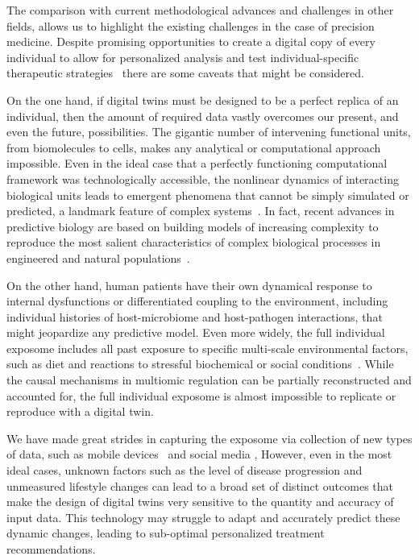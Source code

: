 \documentclass[12pt]{article}
\renewcommand{\(}{\left(}
\renewcommand{\)}{\right)}
\renewcommand{\[}{\left[}
\renewcommand{\]}{\right]}
\begin{document}
The comparison with current methodological advances and challenges in other fields, allows us to highlight the existing challenges in the case of precision medicine. Despite promising opportunities to create a digital copy of every individual to allow for personalized analysis and test individual-specific therapeutic strategies~\cite{laubenbacher2024digital,kamel2021digital,bjornsson2020digital} there are some caveats that might be considered. 

On the one hand, if digital twins must be designed to be a perfect replica of an individual, then the amount of required data vastly overcomes our present, and even the future, possibilities. The gigantic number of intervening functional units, from biomolecules to cells, makes any analytical or computational approach impossible. Even in the ideal case that a perfectly functioning computational  framework was technologically accessible, the nonlinear dynamics of interacting biological units leads to emergent phenomena that cannot be simply simulated or predicted, a landmark feature of complex systems~\cite{artime2022origin,rosen1987complex}. In fact, recent advances in predictive biology are based on building models of increasing complexity to reproduce the most salient characteristics of complex biological processes in engineered and natural populations~\cite{lopatkin2020predictive}. 

On the other hand, human patients have their own dynamical response to internal dysfunctions or differentiated coupling to the environment, including individual histories of host-microbiome and host-pathogen interactions, that might jeopardize any predictive model. 
Even more widely, the full individual exposome includes all past exposure to specific multi-scale environmental factors, such as diet and reactions to stressful biochemical or social conditions~\cite{vermeulen2020exposome,vineis2020new}. While the causal mechanisms in multiomic regulation can be partially reconstructed and accounted for, the full individual exposome is almost impossible to replicate or reproduce with a digital twin.

We have made great strides in capturing the exposome via collection of new types of data, such as mobile devices~\cite{steinhubl2015emerging} and social media \cite{correia2020mining}, 
%
However, even in the most ideal cases, unknown factors such as the level of disease progression and unmeasured lifestyle changes can lead to a broad set of distinct outcomes that make the design of digital twins very sensitive to the quantity and accuracy of input data. This technology may struggle to adapt and accurately predict these dynamic changes, leading to sub-optimal personalized treatment recommendations.
\end{document}

